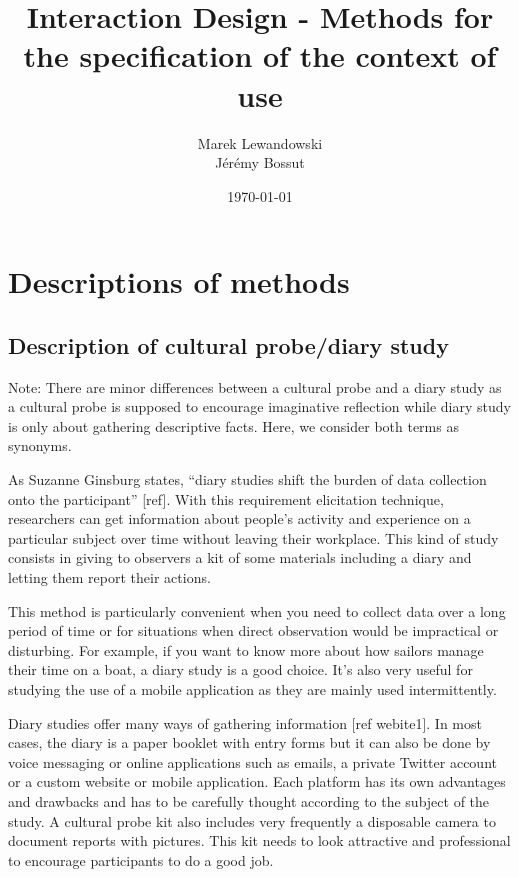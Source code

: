 \documentclass[12pt, a4paper]{article}
\author{Marek Lewandowski \\ Jérémy Bossut}
\date{\today}
\title{Interaction Design - Methods for the specification of the context of use}
\begin{document}
\maketitle
\newpage

\section{Descriptions of methods}

\subsection{Description of cultural probe/diary study}


Note: There are minor differences between a cultural probe and a diary study as a cultural probe is supposed to encourage imaginative reflection while diary study is only about gathering descriptive facts. Here, we consider both terms as synonyms.
 
As Suzanne Ginsburg states, “diary studies shift the burden of data collection onto the participant” [ref]. With this requirement elicitation technique, researchers can get information about people's activity and experience on a particular subject over time without leaving their workplace. This kind of study consists in giving to observers a kit of some materials including a diary and letting them report their actions.

This method is particularly convenient when you need to collect data over a long period of time or for situations when direct observation would be impractical or disturbing. For example, if you want to know more about how sailors manage their time on a boat, a diary study is a good choice. It’s also very useful for studying the use of a mobile application as they are mainly used intermittently.

Diary studies offer many ways of gathering information [ref webite1]. In most cases, the diary is a paper booklet with entry forms but it can also be done by voice messaging or online applications such as emails, a private Twitter account or a custom website or mobile application. Each platform has its own advantages and drawbacks and has to be carefully thought according to the subject of the study. A cultural probe kit also includes very frequently a disposable camera to document reports with pictures. This kit needs to look attractive and professional to encourage participants to do a good job.
\end{document}
